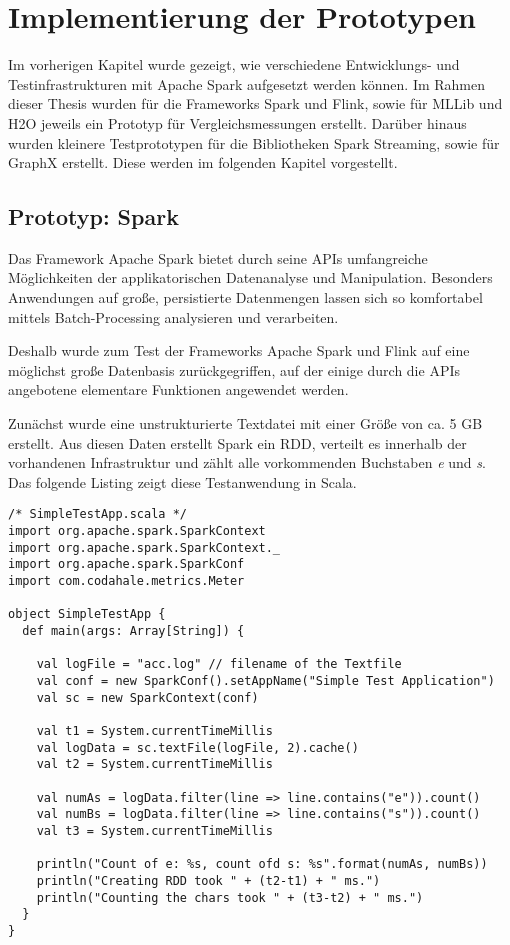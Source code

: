 \chapter{Implementierung der Prototypen }
\label{chapter:implementierung}



Im vorherigen Kapitel wurde gezeigt, wie verschiedene Entwicklungs- und Testinfrastrukturen mit Apache Spark aufgesetzt werden können. Im Rahmen dieser Thesis wurden für die Frameworks Spark und Flink, sowie für MLLib und H2O jeweils ein Prototyp für Vergleichsmessungen erstellt. Darüber hinaus wurden kleinere Testprototypen für die Bibliotheken Spark Streaming, sowie für GraphX erstellt. Diese werden im folgenden Kapitel vorgestellt.  

\section{Prototyp: Spark}
\label{section:prototyp spark}

Das Framework Apache Spark bietet durch seine APIs umfangreiche Möglichkeiten der applikatorischen Datenanalyse und Manipulation. Besonders Anwendungen auf große, persistierte Datenmengen lassen sich so komfortabel mittels Batch-Processing analysieren und verarbeiten. 

Deshalb wurde zum Test der Frameworks Apache Spark und Flink auf eine möglichst große Datenbasis zurückgegriffen, auf der einige durch die APIs angebotene elementare Funktionen angewendet werden.  

Zunächst wurde eine unstrukturierte Textdatei mit einer Größe von ca. 5 GB erstellt. Aus diesen Daten erstellt Spark ein RDD, verteilt es innerhalb der vorhandenen Infrastruktur und zählt alle vorkommenden Buchstaben \textit{e} und \textit{s}. 
Das folgende Listing zeigt diese Testanwendung in Scala.

\newpage

\begin{lstlisting}[label=vwikilogs,caption=SimpleTestApp.scala - zählt Buchstabenvorkommen in Textdateien.]
 /* SimpleTestApp.scala */
import org.apache.spark.SparkContext
import org.apache.spark.SparkContext._
import org.apache.spark.SparkConf
import com.codahale.metrics.Meter

object SimpleTestApp {
  def main(args: Array[String]) {

    val logFile = "acc.log" // filename of the Textfile
    val conf = new SparkConf().setAppName("Simple Test Application")
    val sc = new SparkContext(conf)
    
    val t1 = System.currentTimeMillis
    val logData = sc.textFile(logFile, 2).cache()
    val t2 = System.currentTimeMillis
     
    val numAs = logData.filter(line => line.contains("e")).count()
    val numBs = logData.filter(line => line.contains("s")).count()
    val t3 = System.currentTimeMillis   
    
    println("Count of e: %s, count ofd s: %s".format(numAs, numBs))
    println("Creating RDD took " + (t2-t1) + " ms.")
    println("Counting the chars took " + (t3-t2) + " ms.")
  }
}
\end{lstlisting}

